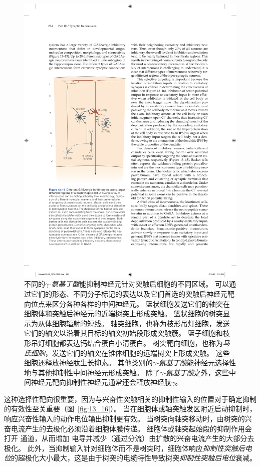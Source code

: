 \begin{figure}[htbp]
	\centering
	\includegraphics[width=0.55\linewidth]{chap13/fig_13_15}
	\caption{不同的\textit{$\gamma$-氨基丁酸}能抑制神经元针对突触后细胞的不同区域。
		可以通过它们的形态、不同分子标记的表达以及它们首选的突触后神经元靶向位点来区分各种各样的中间神经元。
		篮状细胞发送它们的轴突在细胞体和突触后神经元的近端树突上形成突触。
		篮状细胞的树突显示为从体细胞辐射的短线。
		轴突细胞，也称为枝形吊灯细胞，发送它们的轴突以沿着其目标的轴突初始段形成突触簇。
		篮子细胞和枝形吊灯细胞都表达钙结合蛋白小清蛋白。
		树突靶向细胞，也称为\textit{马氏细胞}，发送它们的轴突在锥体细胞的远端树突上形成突触。
		这些细胞还释放神经肽生长抑素。
		其他类别的\textit{$\gamma$-氨基丁酸}能神经元选择性地与其他抑制性中间神经元形成突触。
		除了\textit{$\gamma$-氨基丁酸}之外，这些中间神经元靶向抑制性神经元通常还会释放神经肽$\gamma$。}
	\label{fig:13_15}
\end{figure}


这种选择性靶向很重要，因为与兴奋性突触相关的抑制性输入的位置对于确定抑制的有效性至关重要（图~\ref{fig:13_16}）。
当在细胞体或轴突触发区附近启动抑制时，响应兴奋性输入的动作电位输出抑制更有效。
当树突向轴突移动时，由树突的兴奋电流产生的去极化必须沿着细胞体膜传递。
细胞体或轴突起始段的抑制作用会打开  通道，从而增加  电导并减少（通过分流）由扩散的兴奋电流产生的大部分去极化。
此外，当抑制输入针对细胞体而不是树突时，细胞体响应\textit{抑制性突触后电位}的超极化大小最大，这是由于树突的电缆特性导致树突\textit{抑制性突触后电位}衰减。


